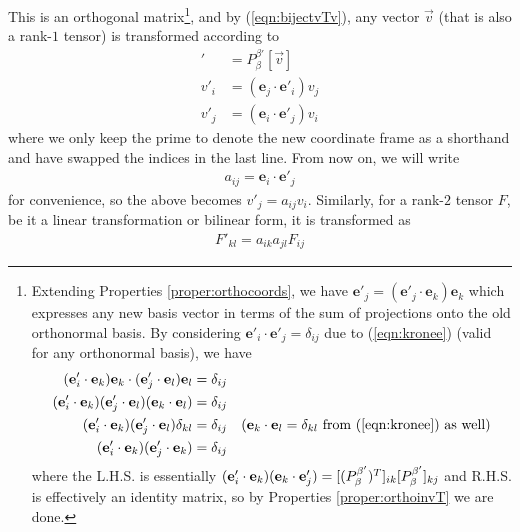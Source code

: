 This is an orthogonal matrix\footnote{\label{foot:orthodelta} Extending Properties \ref{proper:orthocoords}, we have $\textbf{e}'_{j} = (\textbf{e}'_{j} \cdot \textbf{e}_{k})\textbf{e}_{k}$ which expresses any new basis vector in terms of the sum of projections onto the old orthonormal basis. By considering $\textbf{e}'_{i} \cdot \textbf{e}'_{j} = \delta_{ij}$ due to (\ref{eqn:kronee}) (valid for any orthonormal basis), we have
\vspace{\maxdimen}
\begin{align*}
(\textbf{e}'_{i} \cdot \textbf{e}_{k})\textbf{e}_{k} \cdot (\textbf{e}'_{j} \cdot \textbf{e}_{l})\textbf{e}_{l} &= \delta_{ij} \\
(\textbf{e}'_{i} \cdot \textbf{e}_{k})(\textbf{e}'_{j} \cdot \textbf{e}_{l})(\textbf{e}_{k} \cdot \textbf{e}_{l}) &= \delta_{ij} \\
(\textbf{e}'_{i} \cdot \textbf{e}_{k})(\textbf{e}'_{j} \cdot \textbf{e}_{l})\delta_{kl} &= \delta_{ij} & \text{($\textbf{e}_{k} \cdot \textbf{e}_{l} = \delta_{kl}$ from (\ref{eqn:kronee}) as well)} \\
(\textbf{e}'_{i} \cdot \textbf{e}_{k})(\textbf{e}'_{j} \cdot \textbf{e}_{k}) &= \delta_{ij}
\end{align*} where the L.H.S. is essentially $(\textbf{e}'_{i} \cdot \textbf{e}_{k})(\textbf{e}_{k} \cdot \textbf{e}'_{j}) = [\smash{(P_\beta^{\beta'})^T}]_{ik}[\smash{P_\beta^{\beta'}}]_{kj}$ and R.H.S. is effectively an identity matrix, so by Properties \ref{proper:orthoinvT} we are done.}, and by (\ref{eqn:bijectvTv}), any vector $\vec{v}$ (that is also a rank-$1$ tensor) is transformed according to
\begin{align}
[\vec{v}]' &= P_\beta^{\beta'}[\vec{v}] \nonumber \\
v'_i &= (\textbf{e}_j \cdot \textbf{e}'_i) v_j \nonumber \\
v'_j &= (\textbf{e}_i \cdot \textbf{e}'_j) v_i 
\end{align}
where we only keep the prime to denote the new coordinate frame as a shorthand and have swapped the indices in the last line. From now on, we will write 
\begin{align}
a_{ij} = \textbf{e}_i \cdot \textbf{e}'_j \label{eqn:aij}
\end{align} for convenience, so the above becomes $v'_j = a_{ij}v_i$. Similarly, for a rank-$2$ tensor $F$, be it a linear transformation or bilinear form, it is transformed as
\begin{align}
F'_{kl} = a_{ik} a_{jl} F_{ij} \label{eqn:rank2aF}
\end{align}
